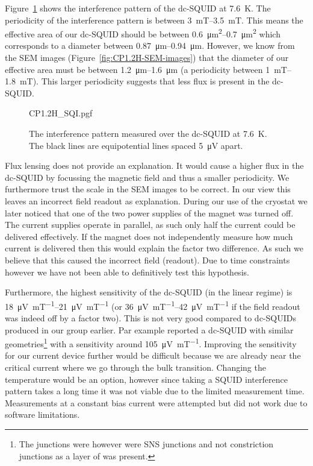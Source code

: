 Figure~\ref{fig:CP1.2H-SQUID-SQI} shows the interference pattern of the dc-SQUID at \qty{7.6}{\kelvin}. The periodicity of the interference pattern is between \qtyrange{3}{3.5}{\milli\tesla}. This means the effective area of our dc-SQUID should be between \qtyrange{0.6}{0.7}{\square\micro\meter} which corresponds to a diameter between \qtyrange{0.87}{0.94}{\micro\meter}. However, we know from the SEM images (Figure~\ref{fig:CP1.2H-SEM-images}) that the diameter of our effective area must be between \qtyrange{1.2}{1.6}{\micro\meter} (a periodicity between \qtyrange{1}{1.8}{\milli\tesla}). This larger periodicity suggests that less flux is present in the dc-SQUID.

\begin{figure}[ht!]
	\centering
	{CP1.2H_SQI.pgf}
	\caption{The interference pattern measured over the dc-SQUID at \qty{7.6}{\kelvin}. The black lines are equipotential lines spaced \qty{5}{\micro\volt} apart.}
	\label{fig:CP1.2H-SQUID-SQI}
\end{figure}

Flux lensing\cite{prigozhin3DSimulationSuperconducting2018} does not provide an explanation. It would cause a higher flux in the dc-SQUID by focussing the magnetic field and thus a smaller periodicity. We furthermore trust the scale in the SEM images to be correct. In our view this leaves an incorrect field readout as explanation. During our use of the cryostat we later noticed that one of the two power supplies of the magnet was turned off. The current supplies operate in parallel, as such only half the current could be delivered effectively. If the magnet does not independently measure how much current is delivered then this would explain the factor two difference. As such we believe that this caused the incorrect field (readout). Due to time constraints however we have not been able to definitively test this hypothesis.

Furthermore, the highest sensitivity of the dc-SQUID (in the linear regime) is \qtyrange{18}{21}{\micro\volt\per\milli\tesla} (or \qtyrange{36}{42}{\micro\volt\per\milli\tesla} if the field readout was indeed off by a factor two). This is not very good compared to dc-SQUIDs produced in our group earlier. Par example \citeauthor{rogSQUIDontipMagneticMicroscopy2022} \citeyear{rogSQUIDontipMagneticMicroscopy2022} reported a dc-SQUID with similar geometries\footnote{The junctions were however were SNS junctions and not constriction junctions as a layer of  was present.} with a sensitivity around \qty{105}{\micro\volt\per\milli\tesla}\cite{rogSQUIDontipMagneticMicroscopy2022}. Improving the sensitivity for our current device further would be difficult because we are already near the critical current where we go through the bulk transition. Changing the temperature would be an option, however since taking a SQUID interference pattern takes a long time it was not viable due to the limited measurement time. Measurements at a constant bias current were attempted but did not work due to software limitations.

